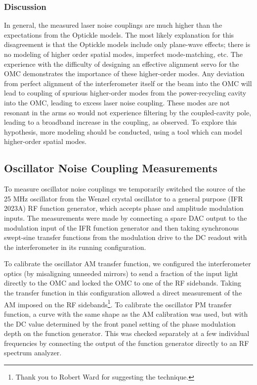 \subsubsection*{Discussion}
In general, the measured laser noise couplings are much higher than
the expectations from the Optickle models.  The most likely
explanation for this disagreement is that the Optickle models include
only plane-wave effects; there is no modeling of higher order spatial
modes, imperfect mode-matching, etc.  The experience with the
difficulty of designing an effective alignment servo for the OMC
demonstrates the importance of these higher-order modes.  Any
deviation from perfect alignment of the interferometer itself or the
beam into the OMC will lead to coupling of spurious higher-order modes
from the power-recycling cavity into the OMC, leading to excess laser
noise coupling.  These modes are not resonant in the arms so would not
experience filtering by the coupled-cavity pole, leading to a
broadband increase in the coupling, as observed.  To explore this
hypothesis, more modeling should be conducted, using a tool which can
model higher-order spatial modes.

\subsection{Oscillator Noise Coupling Measurements}

To measure oscillator noise couplings we temporarily switched the
source of the 25 MHz oscillator from the Wenzel crystal oscillator to
a general purpose (IFR 2023A) RF function generator, which accepts
phase and amplitude modulation inputs.  The measurements were made by
connecting a spare DAC output to the modulation input of the IFR
function generator and then taking synchronous swept-sine transfer
functions from the modulation drive to the DC readout with the
interferometer in its running configuration.

To calibrate the oscillator AM transfer function, we configured the
interferometer optics (by misaligning unneeded mirrors) to send a
fraction of the input light directly to the OMC and locked the OMC to
one of the RF sidebands.  Taking the transfer function in this
configuration allowed a direct measurement of the AM imposed on the RF
sidebands\footnote{Thank you to Robert Ward for suggesting the
  technique.}.  To calibrate the oscillator PM transfer function, a
curve with the same shape as the AM calibration was used, but with the
DC value determined by the front panel setting of the phase modulation
depth on the function generator.  This was checked separately at a few
individual frequencies by connecting the output of the function
generator directly to an RF spectrum analyzer.

